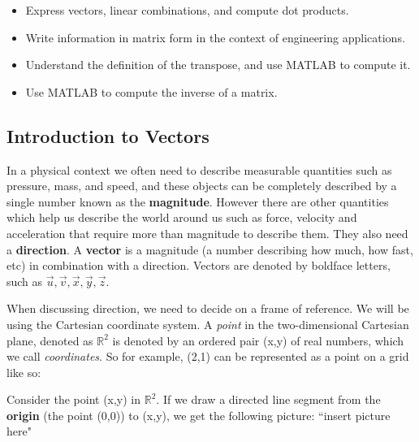



\newpage
\setfont
\pagestyle{fancy}
\renewcommand{\Week}{10}
\renewcommand{\WeekTitle}{\WeekTitleTen}

\fancyhead[LE,RO]{Week \Week}  %
\fancyfoot{}
\sectionbox{Week \#\Week: \WeekTitle}

\vspace{5mm}
\goals 
\begin{itemize}
\item Express vectors, linear combinations, and compute dot products.
\item Write information in matrix form in the context of engineering applications.
\item Understand the definition of the transpose, and use MATLAB to compute it.
\item Use MATLAB to compute the inverse of a matrix.
\end{itemize}

\newpage
{}
\subsection*{Introduction to Vectors}
In a physical context we often need to describe measurable quantities such as pressure, mass, and speed, and these objects can be completely described by a single number known as the \textbf{magnitude}. However there are other quantities which help us describe the world around us such as force, velocity and acceleration that require more than magnitude to describe them. They also need a \textbf{direction}. A \textbf{vector} is a magnitude (a number describing how much, how fast, etc) in combination with a direction. Vectors are denoted by boldface letters, such as $\overrightarrow{u}, \overrightarrow{v}, \overrightarrow{x}, \overrightarrow{y}, \overrightarrow{z}$.

\newpage

When discussing direction, we need to decide on a frame of reference. We will be using the Cartesian coordinate system. A \textit{point} in the two-dimensional Cartesian plane, denoted as $\mathbb{R}^2$ is denoted by an ordered pair (x,y) of real numbers, which we call \textit{coordinates}. So for example, (2,1) can be represented as a point on a grid like so: 



\newpage

Consider the point (x,y) in $\mathbb{R}^2$. If we draw a directed line segment from the \textbf{origin} (the point (0,0)) to (x,y), we get the following picture:
``insert picture here"

